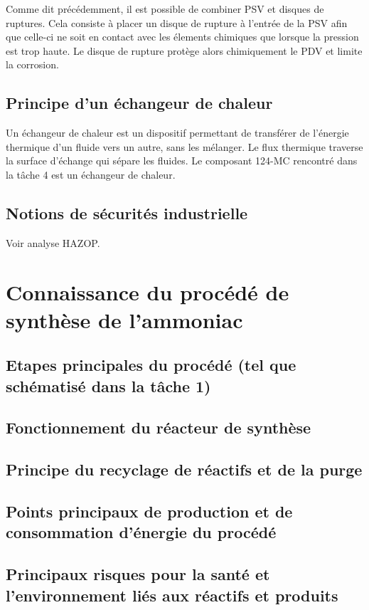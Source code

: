 Comme dit précédemment, il est possible de combiner
PSV et disques de ruptures. Cela consiste à
placer un disque de rupture à l'entrée de la PSV
afin que celle-ci ne soit en contact avec les élements
chimiques que lorsque la pression est trop haute. Le
disque de rupture protège alors chimiquement le PDV et
limite la corrosion.

\subsection{Principe d'un échangeur de chaleur}
Un échangeur de chaleur est un dispositif permettant
de transférer de l'énergie thermique d'un fluide
vers un autre, sans les mélanger. Le flux thermique
traverse la surface d'échange qui sépare les fluides.
Le composant 124-MC rencontré dans la tâche 4 est un
échangeur de chaleur.

\subsection{Notions de sécurités industrielle}
Voir analyse HAZOP.

\section{Connaissance du procédé de synthèse de l'ammoniac}
\subsection{Etapes principales du procédé (tel que schématisé dans la tâche 1)}
\subsection{Fonctionnement du réacteur de synthèse} 
\subsection{Principe du recyclage de réactifs et de la purge}
\subsection{Points principaux de production et de consommation d'énergie du procédé}
\subsection{Principaux risques pour la santé et l'environnement liés aux réactifs et produits}

